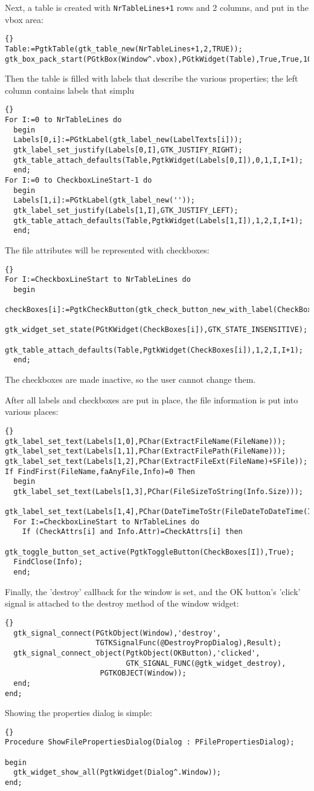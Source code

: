 \documentclass[10pt]{article}
\begin{document}
Next, a table is created with \lstinline|NrTableLines+1| rows and 2 columns,
and put in the vbox area:
\begin{lstlisting}{}
Table:=PgtkTable(gtk_table_new(NrTableLines+1,2,TRUE));
gtk_box_pack_start(PGtkBox(Window^.vbox),PGtkWidget(Table),True,True,10);
\end{lstlisting}
Then the table is filled with labels that describe the various properties;
the left column contains labels that simplu
\begin{lstlisting}{}
For I:=0 to NrTableLines do
  begin 
  Labels[0,i]:=PGtkLabel(gtk_label_new(LabelTexts[i]));
  gtk_label_set_justify(Labels[0,I],GTK_JUSTIFY_RIGHT);
  gtk_table_attach_defaults(Table,PgtkWidget(Labels[0,I]),0,1,I,I+1); 
  end;
For I:=0 to CheckboxLineStart-1 do
  begin 
  Labels[1,i]:=PGtkLabel(gtk_label_new(''));
  gtk_label_set_justify(Labels[1,I],GTK_JUSTIFY_LEFT);
  gtk_table_attach_defaults(Table,PgtkWidget(Labels[1,I]),1,2,I,I+1); 
  end;
\end{lstlisting}
The file attributes will be represented with checkboxes:
\begin{lstlisting}{}
For I:=CheckboxLineStart to NrTableLines do
  begin
  checkBoxes[i]:=PgtkCheckButton(gtk_check_button_new_with_label(CheckBoxTexts[I]));
  gtk_widget_set_state(PGtKWidget(CheckBoxes[i]),GTK_STATE_INSENSITIVE);
  gtk_table_attach_defaults(Table,PgtkWidget(CheckBoxes[i]),1,2,I,I+1); 
  end;  
\end{lstlisting}
The checkboxes are made inactive, so the user cannot change them.

After all labels and checkboxes are put in place, the file information
is put into various places:
\begin{lstlisting}{}
gtk_label_set_text(Labels[1,0],PChar(ExtractFileName(FileName)));
gtk_label_set_text(Labels[1,1],PChar(ExtractFilePath(FileName)));
gtk_label_set_text(Labels[1,2],PChar(ExtractFileExt(FileName)+SFile));
If FindFirst(FileName,faAnyFile,Info)=0 Then
  begin
  gtk_label_set_text(Labels[1,3],PChar(FileSizeToString(Info.Size)));
  gtk_label_set_text(Labels[1,4],PChar(DateTimeToStr(FileDateToDateTime(Info.Time))));
  For I:=CheckboxLineStart to NrTableLines do
    If (CheckAttrs[i] and Info.Attr)=CheckAttrs[i] then
      gtk_toggle_button_set_active(PgtkToggleButton(CheckBoxes[I]),True);
  FindClose(Info);
  end;
\end{lstlisting}
Finally, the 'destroy' callback for the window is set, and the OK button's
'click' signal is attached to the destroy method of the window widget:
\begin{lstlisting}{}
  gtk_signal_connect(PGtkObject(Window),'destroy',
                     TGTKSignalFunc(@DestroyPropDialog),Result);
  gtk_signal_connect_object(PgtkObject(OKButton),'clicked',
                            GTK_SIGNAL_FUNC(@gtk_widget_destroy),
                      PGTKOBJECT(Window));
  end;    
end;
\end{lstlisting}
Showing the properties dialog is simple:
\begin{lstlisting}{}
Procedure ShowFilePropertiesDialog(Dialog : PFilePropertiesDialog);

begin
  gtk_widget_show_all(PgtkWidget(Dialog^.Window));
end;
\end{lstlisting}
\end{document}
